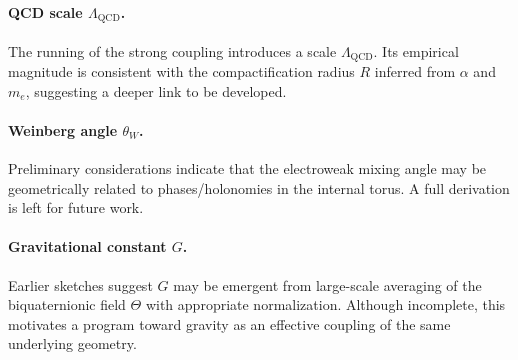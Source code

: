 \paragraph{QCD scale $\Lambda_{\text{QCD}}$.}
The running of the strong coupling introduces a scale $\Lambda_{\text{QCD}}$. Its empirical magnitude is consistent with the compactification radius $R$ inferred from $\alpha$ and $m_e$, suggesting a deeper link to be developed.

\paragraph{Weinberg angle $\theta_W$.}
Preliminary considerations indicate that the electroweak mixing angle may be geometrically related to phases/holonomies in the internal torus. A full derivation is left for future work.

\paragraph{Gravitational constant $G$.}
Earlier sketches suggest $G$ may be emergent from large-scale averaging of the biquaternionic field $\Theta$ with appropriate normalization. Although incomplete, this motivates a program toward gravity as an effective coupling of the same underlying geometry.
